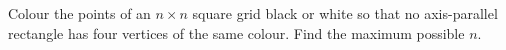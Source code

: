 Colour the points of an $n\times n$ square grid black or white so that no axis-parallel rectangle has four vertices of the same colour. Find the maximum possible $n$.
